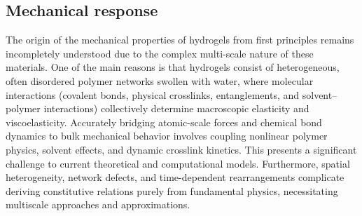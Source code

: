\subsection{Mechanical response}

The origin of the mechanical properties of hydrogels from first principles remains incompletely understood due to the complex multi-scale nature of these materials.
One of the main reasons is that hydrogels consist of heterogeneous, often disordered polymer networks swollen with water, where molecular interactions (covalent bonds, physical crosslinks, entanglements, and solvent–polymer interactions) collectively determine macroscopic elasticity and viscoelasticity. 
Accurately bridging atomic-scale forces and chemical bond dynamics to bulk mechanical behavior involves coupling nonlinear polymer physics, solvent effects, and dynamic crosslink kinetics. 
This presents a significant challenge to current theoretical and computational models. 
Furthermore, spatial heterogeneity, network defects, and time-dependent rearrangements complicate deriving constitutive relations purely from fundamental physics, necessitating multiscale approaches and approximations.



